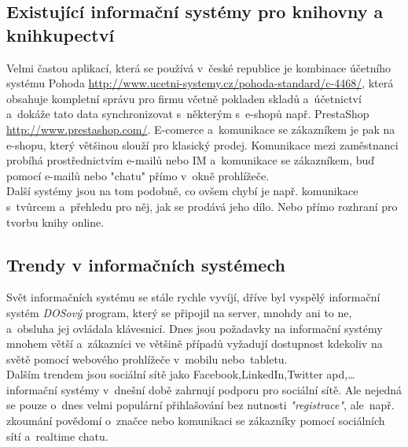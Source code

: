\documentclass[a4paper,12pt,twoside,BCOR=10mm]{article}
\renewcommand{\it}[1]{\textit{#1}}    %
\begin{document}
\subsection{Existující informační systémy pro knihovny a knihkupectví}
Velmi častou aplikací, která se používá v~české republice je kombinace účetního systému Pohoda \href{http://www.ucetni-systemy.cz/pohoda-standard/c-4468/}{http://www.ucetni-systemy.cz/pohoda-standard/c-4468/}, která obsahuje kompletní správu pro firmu včetně pokladen skladů a~účetnictví a~dokáže tato data synchronizovat s~některým s~e-shopů např. PrestaShop \href{http://www.prestashop.com/}{http://www.prestashop.com/}. E-comerce a~komunikace se zákazníkem je pak na e-shopu, který většinou slouží pro klasický prodej. Komunikace mezi zaměstnanci probíhá prostřednictvím e-mailů nebo IM a~komunikace se zákazníkem, buď pomocí e-mailů nebo "chatu" přímo v~okně prohlížeče.\\
Další systémy jsou na tom podobně, co ovšem chybí je např. komunikace s~tvůrcem a~přehledu pro něj, jak se prodává jeho dílo. Nebo přímo rozhraní pro tvorbu knihy online.\\

\subsection{Trendy v informačních systémech}
Svět informačních systému se stále rychle vyvíjí, dříve byl vyspělý informační systém \it{DOSový} program, který se připojil na server, mnohdy ani to ne, a~obsluha jej ovládala klávesnicí. Dnes jsou požadavky na informační systémy mnohem větší a~zákazníci ve většině případů vyžadují dostupnost kdekoliv na světě pomocí webového prohlížeče v~mobilu nebo~tabletu.\cite{trendsIS}\\
Dalším trendem jsou sociální sítě jako Facebook,LinkedIn,Twitter apd,… informační systémy v~dnešní době zahrnují podporu pro sociální sítě. Ale nejedná se pouze o~dnes velmi populární přihlašování bez nutnosti \it{"registrace"}, ale~např. zkoumání povědomí o~značce nebo komunikaci se zákazníky pomocí sociálních sítí a~realtime chatu.\cite{trendsIS}\\
\end{document}
